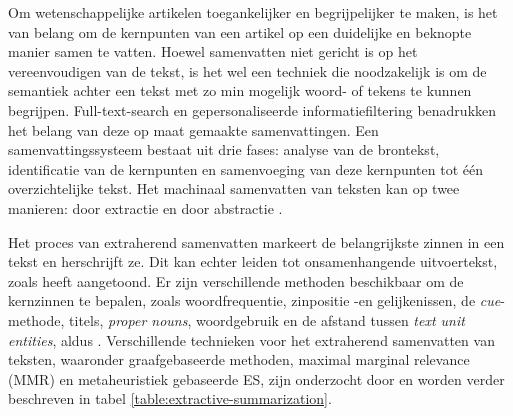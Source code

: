 \medspace

Om wetenschappelijke artikelen toegankelijker en begrijpelijker te maken, is het van belang om de kernpunten van een artikel op een duidelijke en beknopte manier samen te vatten. Hoewel samenvatten niet gericht is op het vereenvoudigen van de tekst, is het wel een techniek die noodzakelijk is om de semantiek achter een tekst met zo min mogelijk woord- of tekens te kunnen begrijpen. Full-text-search en gepersonaliseerde informatiefiltering benadrukken het belang van deze op maat gemaakte samenvattingen. Een samenvattingssysteem bestaat uit drie fases: analyse van de brontekst, identificatie van de kernpunten en samenvoeging van deze kernpunten tot één overzichtelijke tekst. Het machinaal samenvatten van teksten kan op twee manieren: door extractie en door abstractie \autocite{Hahn2000, Dubay2004}.

\medspace

Het proces van extraherend samenvatten markeert de belangrijkste zinnen in een tekst en herschrijft ze. Dit kan echter leiden tot onsamenhangende uitvoertekst, zoals \textcite{Khan2014} heeft aangetoond. Er zijn verschillende methoden beschikbaar om de kernzinnen te bepalen, zoals woordfrequentie, zinpositie -en gelijkenissen, de \textit{cue}-methode, titels, \textit{proper nouns}, woordgebruik en de afstand tussen \textit{text unit entities}, aldus \textcite{Khan2014}. Verschillende technieken voor het extraherend samenvatten van teksten, waaronder graafgebaseerde methoden, maximal marginal relevance (MMR) en metaheuristiek gebaseerde ES, zijn onderzocht door \textcite{Verma2020} en worden verder beschreven in tabel \ref{table:extractive-summarization}.

